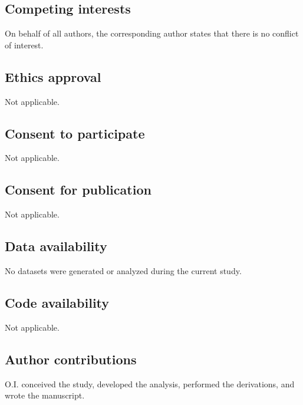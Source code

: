 \documentclass[aps,pre,reprint,amsmath,amssymb,floatfix,nofootinbib]{revtex4-2}
\begin{document}
\subsection*{Competing interests}
    On behalf of all authors, the corresponding author states that there is no conflict of interest.

\subsection*{Ethics approval}
    Not applicable.

\subsection*{Consent to participate}
    Not applicable.

\subsection*{Consent for publication}
    Not applicable.

\subsection*{Data availability}
    No datasets were generated or analyzed during the current study.

\subsection*{Code availability}
    Not applicable.

\subsection*{Author contributions}
    O.I. conceived the study, developed the analysis, performed the derivations, and wrote the manuscript.
\end{document}
